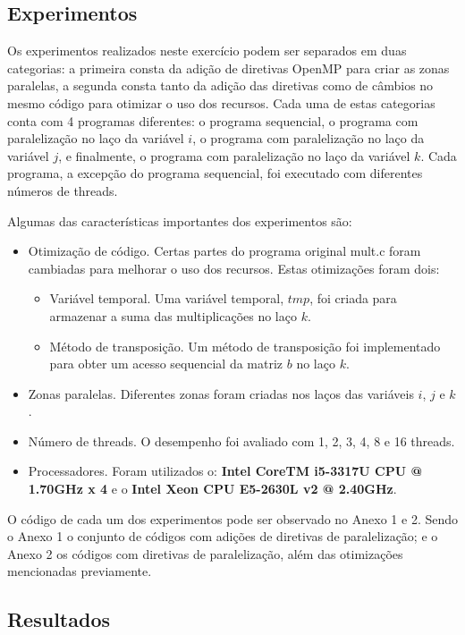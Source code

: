 \documentclass[a4paper,12pt,fleqn]{article}
\begin{document}
\subsection{Experimentos} 
Os experimentos realizados neste exercício podem ser separados em duas categorias: a primeira consta da adição de diretivas OpenMP para criar as zonas paralelas, a segunda consta tanto da adição das  diretivas como de câmbios no mesmo código para otimizar o uso dos recursos. Cada uma de estas categorias conta com 4 programas diferentes: o programa sequencial, o programa com paralelização no laço da variável $i$, o programa com paralelização no laço da variável $j$, e finalmente, o programa com paralelização no laço da variável $k$. Cada programa, a excepção do programa sequencial, foi executado com diferentes números de threads.  
 
Algumas das características importantes dos experimentos são: 
\begin{itemize} 
    \item Otimização de código. Certas partes do programa original mult.c foram cambiadas para melhorar o uso dos recursos. Estas otimizações foram dois: 
    \begin{itemize}
        \item Variável temporal. Uma variável temporal, $tmp$, foi criada para armazenar a suma das multiplicações no laço $k$.
        \item Método de transposição. Um método de transposição foi implementado para obter um acesso sequencial da matriz $b$ no laço $k$.
    \end{itemize}
    \item Zonas paralelas. Diferentes zonas foram criadas nos laços das variáveis $i$, $j$ e $k$.  
    \item Número de threads. O desempenho foi avaliado com 1, 2, 3, 4, 8 e 16 threads.   
    \item Processadores. Foram utilizados o: \textbf{Intel CoreTM i5-3317U CPU @ 1.70GHz x 4} e o \textbf{Intel Xeon CPU E5-2630L v2 @ 2.40GHz}.
\end{itemize} 

O código de cada um dos experimentos pode ser observado no Anexo 1 e 2. Sendo o Anexo 1 o conjunto de códigos com adições de diretivas de paralelização; e o Anexo 2 os códigos com diretivas de paralelização, além das otimizações mencionadas previamente.  

\subsection{Resultados} 
\end{document}
